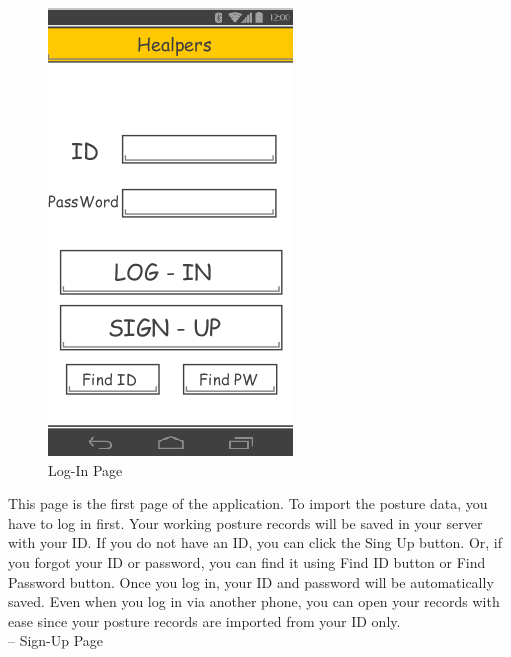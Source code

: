 \documentclass[conference]{IEEEtran}
\begin{document}
\begin{figure}[h]
\begin{center}
    \includegraphics[scale=1]{img_10}
    \caption{Log-In Page} 
\end{center}
\end{figure}

 This page is the first page of the application. To import the posture data, you have to log in first. Your working posture records will be saved in your server with your ID. If you do not have an ID, you can click the Sing Up  button. Or, if you forgot your ID or password, you can find it using Find ID button or Find Password button. Once you log in, your ID and password will be automatically saved. Even when you log in via another phone, you can  open your records with ease since your posture records are imported from your ID only.\\

 -- Sign-Up Page\\
 
\end{document}
